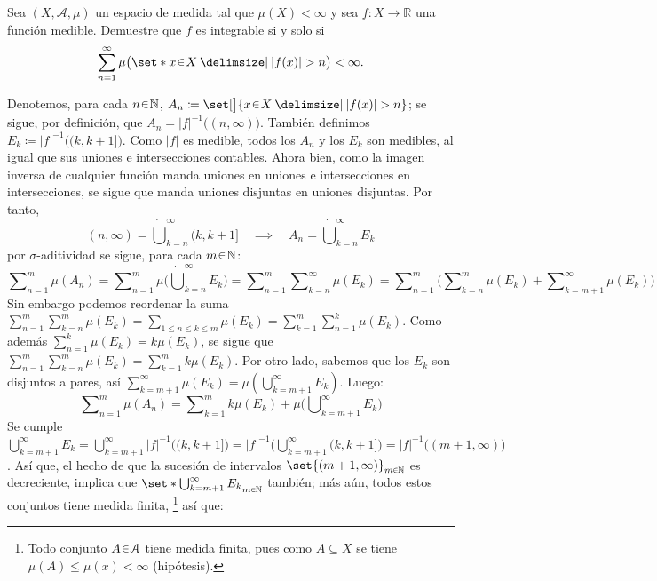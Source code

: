 \setcounter{neje}{62}
\begin{nejer}
Sea $(X, \mathcal{A}, \mu)$ un espacio de medida tal que $\mu(X) < \infty$ y sea $f \colon X \to \mathbb{R}$ una función medible. Demuestre que $f$ es integrable si y solo si
$$
\sum_{n=1}^{\infty} \mu\big(\set*{x \en X \given |f(x)| > n}\big) < \infty.
$$
\end{nejer}
\begin{sol}
Denotemos, para cada $n\en\mathbb{N}$, $A_n \coloneq \set[\big]{x \en X \given |f(x)|>n}$; se sigue, por definición, que $A_n = |f|^{-1}\big((n,\infty)\big)$. También definimos $E_k \coloneq |f|^{-1}\big((k,k+1]\big)$. Como $|f|$ es medible, todos los $A_n$ y los $E_k$ son medibles, al igual que sus uniones e intersecciones contables. Ahora bien, como la imagen inversa de cualquier función manda uniones en uniones e intersecciones en intersecciones, se sigue que manda uniones disjuntas en uniones disjuntas. Por tanto,
\[
(n,\infty) = \dot\bigcup^\infty_{k=n}(k,k+1]%
\quad\implies\quad%
A_n = \dot\bigcup^\infty_{k=n}E_k
\]
por $\sigma$-aditividad se sigue, para cada $m\en\mathbb{N}$:
\[
\sum\nolimits^m_{n=1}\mu(A_n)%
=\sum\nolimits^m_{n=1}\mu\Big( \dot\bigcup^\infty_{k=n}E_k \Big)%
=\sum\nolimits^m_{n=1}\sum\nolimits^\infty_{k=n}\mu(E_k)%
=\sum\nolimits^m_{n=1}\Big(\sum\nolimits^m_{k=n}\mu(E_k) + \sum\nolimits^\infty_{k=m+1}\mu(E_k)\Big)
\]
Sin embargo podemos reordenar la suma $\sum^m_{n=1}\sum^m_{k=n}\mu(E_k) = \sum_{1\leq n \leq k \leq m} \mu(E_k) = \sum^m_{k=1}\sum^k_{n=1}\mu(E_k)$. Como además $\sum^k_{n=1}\mu(E_k) = k\mu(E_k)$, se sigue que $\sum^m_{n=1}\sum^m_{k=n}\mu(E_k) = \sum^m_{k=1}k\mu(E_k)$. Por otro lado, sabemos que los $E_k$ son disjuntos a pares, así $\sum^\infty_{k=m+1}\mu(E_k) = \mu(\bigcup^\infty_{k=m+1}E_k)$. Luego:
\begin{equation}\label{eq:reord}
\sum\nolimits^m_{n=1}\mu(A_n)%
= \sum\nolimits^m_{k=1}k\mu(E_k) + \mu\Big( \bigcup\nolimits^\infty_{k=m+1}E_k \Big)
\end{equation}
Se cumple $\bigcup^\infty_{k=m+1} E_k = \bigcup^\infty_{k=m+1}|f|^{-1}\big((k,k+1]\big) = |f|^{-1}\big(\bigcup^\infty_{k=m+1}(k,k+1]\big) =|f|^{-1}\big((m+1,\infty)\big)$. Así que, el hecho de que la sucesión de intervalos $\set{(m+1,\infty)}_{m\en\mathbb{N}}$ es decreciente, implica que $\set*{\bigcup^\infty_{k=m+1} E_k}_{m\en\mathbb{N}}$ también; más aún, todos estos conjuntos tiene medida finita,%
\footnote{
    Todo conjunto $A \en \mathcal{A}$ tiene medida finita, pues como $A\subseteq X$ se tiene $\mu(A) \leq \mu(x) < \infty$ (hipótesis).
}
así que:%

\end{sol}
